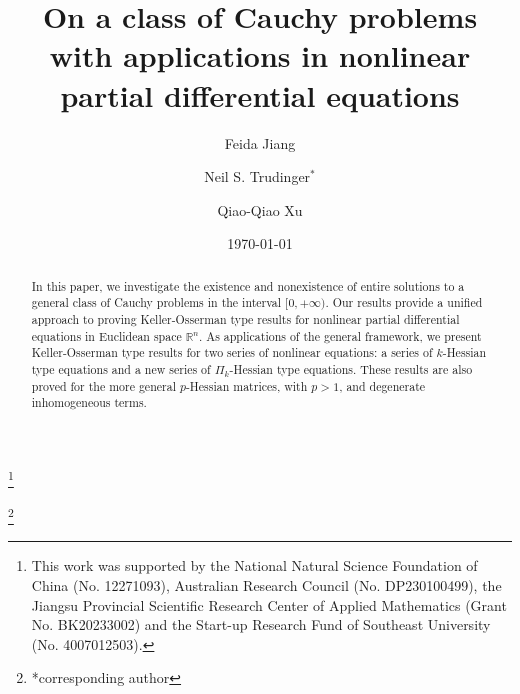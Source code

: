 \documentclass[a4paper,11pt]{amsart}
\theoremstyle{plain}
\theoremstyle{remark}
\numberwithin{equation}{section}
\numberwithin{figure}{section}
\numberwithin{remark}{section}
\begin{document}
\begin{sloppypar}

	
	\title{On a class of Cauchy problems with applications in nonlinear partial differential equations}

	\author{Feida Jiang}
	\address{School of Mathematics and Shing-Tung Yau Center of Southeast University, Southeast University, Nanjing 211189, P.R. China; Shanghai Institute for Mathematics and Interdisciplinary Sciences, Shanghai, 200433, P.R.China}
	\author{Neil S. Trudinger$^*$}
	\address{Mathematical Sciences Institute, The Australian National University, Canberra ACT 0200, Australia}
	\author{Qiao-Qiao Xu}
	\address{School of Mathematics and Shing-Tung Yau Center of Southeast University, Southeast University, Nanjing 211189, P.R. China}
	\thanks{This work was supported by the National Natural Science Foundation of China (No. 12271093), Australian Research Council (No. DP230100499), the Jiangsu Provincial Scientific Research Center of Applied Mathematics (Grant No. BK20233002) and the Start-up Research Fund of Southeast University (No. 4007012503).}
	
	
	
	\date{\today}
	\thanks{*corresponding author}
	
	
	
	\begin{abstract}
	In this paper, we investigate the existence and nonexistence of entire solutions to a general class of Cauchy problems in the interval $[0, +\infty)$.
Our results provide a unified approach to proving Keller-Osserman type results for nonlinear partial differential equations in Euclidean space $\mathbb{R}^n$. As applications of the general framework, we present Keller-Osserman type results for two series of nonlinear equations: a series of $k$-Hessian type equations and a new series of $\Pi_k$-Hessian type equations. These results are also proved for the more general $p$-Hessian matrices, with $p>1$, and degenerate inhomogeneous terms. 
         \end{abstract}


\maketitle


\end{sloppypar}
\end{document}
